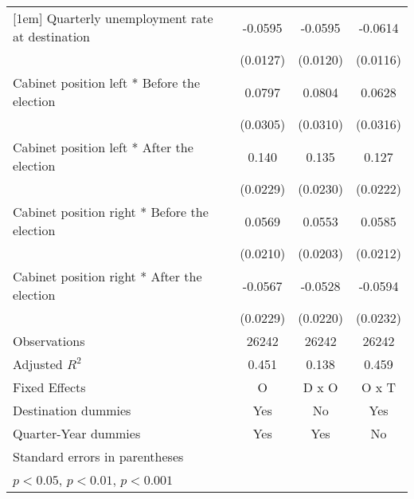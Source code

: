 \begin{table}[htbp]
\begin{tabular}{l*{3}{c}}
[1em]
Quarterly unemployment rate at destination&     -0.0595\sym{***}&     -0.0595\sym{***}&     -0.0614\sym{***}\\
                    &    (0.0127)         &    (0.0120)         &    (0.0116)         \\
[1em]
Cabinet position left * Before the election&      0.0797\sym{*}  &      0.0804\sym{*}  &      0.0628         \\
                    &    (0.0305)         &    (0.0310)         &    (0.0316)         \\
[1em]
Cabinet position left * After the election&       0.140\sym{***}&       0.135\sym{***}&       0.127\sym{***}\\
                    &    (0.0229)         &    (0.0230)         &    (0.0222)         \\
[1em]
Cabinet position right * Before the election&      0.0569\sym{**} &      0.0553\sym{**} &      0.0585\sym{**} \\
                    &    (0.0210)         &    (0.0203)         &    (0.0212)         \\
[1em]
Cabinet position right * After the election&     -0.0567\sym{*}  &     -0.0528\sym{*}  &     -0.0594\sym{*}  \\
                    &    (0.0229)         &    (0.0220)         &    (0.0232)         \\
\hline
Observations        &       26242         &       26242         &       26242         \\
Adjusted \(R^{2}\)  &       0.451         &       0.138         &       0.459         \\
Fixed Effects       &           O         &       D x O         &       O x T         \\
Destination dummies &         Yes         &          No         &         Yes         \\
Quarter-Year dummies&         Yes         &         Yes         &          No         \\
\hline\hline
\multicolumn{4}{l}{\footnotesize Standard errors in parentheses}\\
\multicolumn{4}{l}{\footnotesize \sym{*} \(p<0.05\), \sym{**} \(p<0.01\), \sym{***} \(p<0.001\)}\\
\end{tabular}
\end{table}
